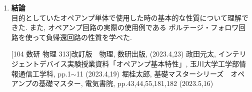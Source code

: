 \documentclass[uplatex,a4paper,11pt,dvipdfmxs]{jsarticle}
\begin{document}
\begin{enumerate}
    \item {\bf \large 結論}\\
    \quad 目的としていたオペアンプ単体で使用した時の基本的な性質について理解できた. また, オペアンプ回路の実際の使用例である
    ボルテージ・フォロワ回路を使って負帰還回路の性質を学べた.\\

    \begin{thebibliography}{9}
     [104 数研 物理 313]改訂版　物理, 数研出版, (2023.4,23)
     政田元太, インテリジェントデバイス実験授業資料「オペアンプ基本特性」, 玉川大学工学部情報通信工学科, 
    pp.1\(\sim \)11 (2023.4,19)
     堀桂太郎, 基礎マスターシリーズ　オペアンプの基礎マスター, 電気書院, pp.43,44,55,181,182 (2023.5,16)
    \end{thebibliography}
\end{enumerate}
\end{document}
